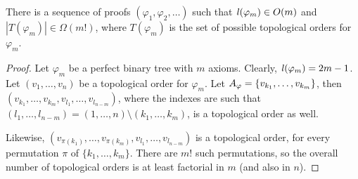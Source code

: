 \begin{theorem}
\label{theorem:enumeration}
There is a sequence of proofs $(\varphi_1,\varphi_2,\ldots)$ such that $\mathit{l}(\varphi_m) \in O(m)$ and $|T(\varphi_m)| \in \Omega(m!)$, where $T(\varphi_m)$ is the set of possible topological orders for $\varphi_m$.
\end{theorem}
\begin{proof}
Let $\varphi_m$ be a perfect binary tree with $m$ axioms. Clearly, $\mathit{l}(\varphi_m) = 2m-1$.
Let $(v_1,\ldots,v_n)$ be a topological order for $\varphi_m$. 
Let $A_{\varphi} = \{v_{k_1},\ldots,v_{k_m}\}$, then $(v_{k_1},\ldots,v_{k_m},v_{l_1},\ldots,v_{l_{n-m}})$, 
where the indexes are such that $(l_1,\ldots,l_{n-m}) = (1,\ldots,n) \setminus (k_1,\ldots,k_m)$, is a topological order as well. 

Likewise, $(v_{\pi({k_1})},\ldots,v_{\pi({k_m})},v_{l_1},\ldots,v_{l_{n-m}})$ is a topological order, for every permutation $\pi$ of $\{k_1,\ldots,k_m\}$. There are $m!$ such permutations, so the overall number of topological orders is at least factorial in $m$ (and also in $n$).
\end{proof}


